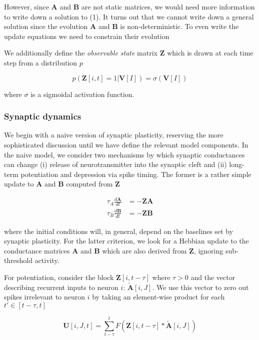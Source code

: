 \documentclass{article} %
\begin{document}
However, since $\mathbf{A}$ and $\mathbf{B}$ are not static matrices, we would need more information to write down a solution to (1). It turns out that we cannot write down a general solution since the evolution $\mathbf{A}$ and $\mathbf{B}$ is non-deterministic. To even write the update equations we need to constrain their evolution

We additionally define the \emph{observable state} matrix $\mathbf{Z}$ which is drawn at each time step from a distribution $p$ 

\begin{equation*}
p(\mathbf{Z}[i,t] = 1 | \mathbf{V}[I]) = \sigma(\mathbf{V}[I])
\end{equation*}

where $\sigma$ is a sigmoidal activation function. 

\subsubsection{Synaptic dynamics}

We begin with a naive version of synaptic plasticity, reserving the more sophisticated discussion until we have define the relevant model components. In the naive model, we consider two mechanisms by which synaptic conductances can change (i) release of neurotransmitter into the synaptic cleft and (ii) long-term potentiation and depression via spike timing. The former is a rather simple update to $\mathbf{A}$ and $\mathbf{B}$ computed from $\mathbf{Z}$

\begin{align*}
\tau_{A}\frac{d\mathbf{A}}{dt} &= -\mathbf{Z}\mathbf{A}\\
\tau_{B}\frac{d\mathbf{B}}{dt} &= -\mathbf{Z}\mathbf{B}
\end{align*}

where the initial conditions will, in general, depend on the baselines set by synaptic plasticity. For the latter criterion, we look for a Hebbian update to the conductance matrices $\mathbf{A}$ and $\mathbf{B}$ which are also derived from $\mathbf{Z}$, ignoring sub-threshold activity.

For potentiation, consider the block $\mathbf{Z}[i,t-\tau]$ where $\tau > 0$ and the vector describing recurrent inputs to neuron $i$: $\tilde{\mathbf{A}}[i,J]$. We use this vector to zero out spikes irrelevant to neuron $i$ by taking an element-wise product for each $t'\in [t-\tau, t]$

\begin{equation*}
\mathbf{U}[i,J,t] = \sum_{t-\tau}^{t} F\left( \mathbf{Z}[i,t-\tau]*\tilde{\mathbf{A}}[i,J]\right)
\end{equation*}
\end{document}
